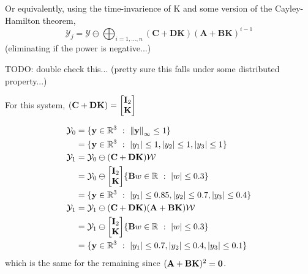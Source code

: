 \documentclass[]{article}
\newcommand{\R}{\mathbb{R}}
\newcommand{\st}{\ : \ }
\begin{document}
Or equivalently, using the time-invarience of K and some version of the Cayley-Hamilton theorem, 
\begin{equation}
    \mathcal{Y}_{j} = \mathcal{Y} \ominus \bigoplus_{i = 1,\dots,n} (\mathbf{C+DK}) (\mathbf{A+BK})^{i-1}
\end{equation}
(eliminating if the power is negative...)

TODO: double check this... (pretty sure this falls under some distributed property...)

For this system,
$(\mathbf{C+DK}) = \mqty[\vb{I}_2\\\mathbf{K}]$

\begin{equation}
    \begin{aligned}
        \mathcal{Y}_0 &= \{\vb{y} \in \R^3 \st \norm{\vb{y}}_{\infty}\leq 1\}\\
            &= \{\vb{y} \in \R^{3} \st \abs{y_1} \leq 1, \abs{y_2} \leq 1, \abs{y_3}\leq 1\}\\
        \mathcal{Y}_1 &= \mathcal{Y}_0 \ominus (\mathbf{C+DK}) \mathcal{W}\\
            &= \mathcal{Y}_0 \ominus \mqty[\vb{I}_2\\\mathbf{K}] \{ \vb{B} w \in \R \st \abs{w} \leq 0.3\}\\
            &= \{\vb{y} \in \R^{3} \st \abs{y_1} \leq 0.85, \abs{y_2} \leq 0.7, \abs{y_3}\leq 0.4\}\\
        \mathcal{Y}_1 &= \mathcal{Y}_1 \ominus (\mathbf{C+DK}) \mathbf{(A+BK)}\mathcal{W}\\
            &= \mathcal{Y}_1 \ominus \mqty[\vb{I}_2\\\mathbf{K}] \{\vb{B} w \in \R \st \abs{w} \leq 0.3\}\\
            &= \{\vb{y} \in \R^{3} \st \abs{y_1} \leq 0.7, \abs{y_2} \leq 0.4, \abs{y_3}\leq 0.1\}\\
    \end{aligned}
\end{equation}
which is the same for the remaining since $(\mathbf{A+BK})^2 = \vb{0}$.








\end{document}
